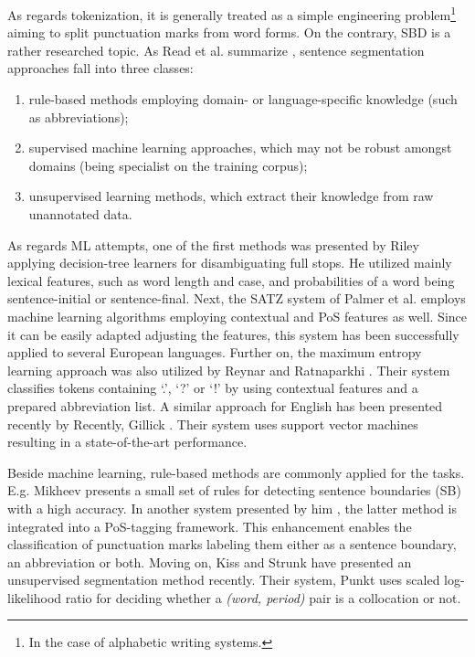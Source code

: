 As regards tokenization, it is generally treated as a simple engineering problem\footnote{In the case of alphabetic writing systems.} aiming to split punctuation marks from word forms. On the contrary, SBD is a rather researched topic. As Read et al. summarize \cite{read2012sentence}, sentence segmentation approaches fall into three classes: 
\begin{enumerate}
 \item rule-based methods employing domain- or language-specific knowledge (such as abbreviations); 
 \item supervised machine learning approaches, which may not be robust amongst domains (being specialist on the training corpus); 
 \item unsupervised learning methods, which extract their knowledge from raw unannotated data. 
\end{enumerate}

As regards ML attempts, one of the first methods was presented by Riley \cite{riley1989some} applying decision-tree learners for disambiguating full stops. He utilized mainly lexical features, such as word length and case, and probabilities of a word being sentence-initial or sentence-final. 
Next, the SATZ system of Palmer et al. \cite{palmer1997adaptive} employs machine learning algorithms employing contextual and PoS features as well. 
Since it can be easily adapted adjusting the features, this system has been successfully applied \cite{palmer1997adaptive} to several European languages. 
Further on, the maximum entropy learning approach was also utilized by Reynar and Ratnaparkhi \cite{reynar1997maximum}. 
Their system classifies tokens containing `.', `?' or `!' by using contextual features and a prepared abbreviation list. A similar approach for English has been presented recently by
Recently, Gillick \cite{gillick2009sentence}. Their system uses support vector machines resulting in a state-of-the-art performance.

Beside machine learning, rule-based methods are commonly applied for the tasks. E.g. Mikheev presents \cite{mikheev2002periods} a small set of rules for detecting sentence boundaries (SB) with a high accuracy. 
In another system presented by him \cite{mikheev2000tagging}, the latter method is integrated into a PoS-tagging framework. This enhancement enables the classification of punctuation marks labeling them either as a sentence boundary, an abbreviation or both. 
Moving on, Kiss and Strunk have presented an unsupervised segmentation method recently. 
Their system, Punkt \cite{kiss2006unsupervised} uses scaled log-likelihood ratio for deciding whether a \emph{(word, period)} pair is a collocation or not.

